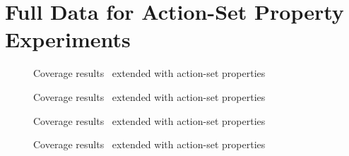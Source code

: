 \onecolumn
\section{Full Data for Action-Set Property Experiments}
\label{data-action-set-properties}



\begin{figure*}[ht]
	
	\caption{Coverage results \blocksworld\ extended with action-set properties }
\end{figure*}

\begin{figure*}[ht]
	
	\caption{Coverage results \nomystery\ extended with action-set properties }
\end{figure*}

\begin{figure*}[ht]
	
	\caption{Coverage results \rovers\ extended with action-set properties }
\end{figure*}

\begin{figure*}[ht]
	
	\caption{Coverage results \tpp\ extended with action-set properties}
\end{figure*}


